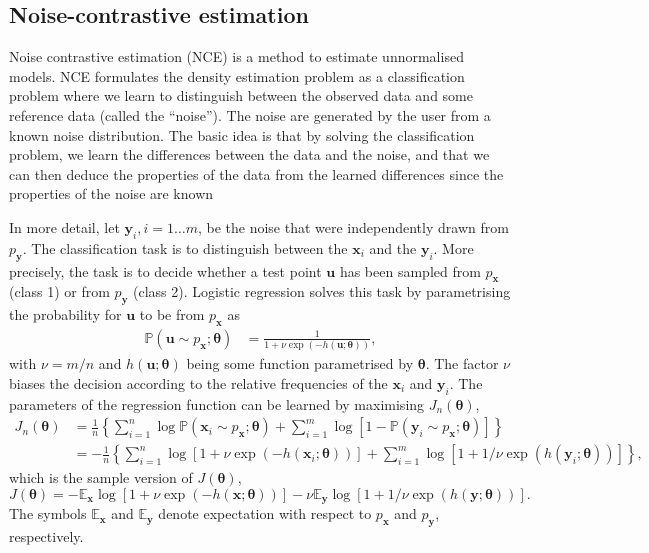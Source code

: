 \documentclass[11pt, oneside]{article}
\newcommand{\thetab}{{\boldsymbol{\theta}}}
\newcommand{\pdata}{p_{ \mathbf x}}
\newcommand{\pnoise}{p_{ \mathbf y}}
\renewcommand{\u}{{\mathbf u}}
\newcommand{\x}{{\mathbf x}}
\newcommand{\y}{{\mathbf y}}
\renewcommand{\P}{\mathbb{P}}
\newcommand{\E}{\mathbb{E}}
\newcommand{\Ex}{\E_{\x}}
\newcommand{\Ey}{\E_{\y}}
\begin{document}
\subsection{Noise-contrastive estimation}
Noise contrastive estimation (NCE) is a method to estimate
unnormalised models. NCE formulates the density estimation
problem as a classification problem where we learn to distinguish
between the observed data and some reference data (called the
``noise''). The noise are generated by the user from a known noise
distribution. The basic idea is that by solving the classification
problem, we learn the differences between the data and the noise, and
that we can then deduce the properties of the data from the learned
differences since the properties of the noise are known

In more detail, let $\y_i, i=1 \ldots m$, be the noise that were
independently drawn from $\pnoise$. The classification task is to
distinguish between the $\x_i$ and the $\y_i$. More precisely, the
task is to decide whether a test point $\u$ has been sampled from
$\pdata$ (class 1) or from $\pnoise$ (class 2). Logistic regression
solves this task by parametrising the probability for $\u$ to be from
$\pdata$ as
\begin{align}
  \P( \u \sim \pdata; \thetab ) &= \frac{1}{1+\nu \exp(-h(\u;\thetab))}, 
\end{align}
with $\nu = m/n$ and $h(\u;\thetab)$ being some function
para\-metrised by $\thetab$. The factor $\nu$ biases the decision
according to the relative frequencies of the $\x_i$ and $\y_i$. The
parameters of the regression function can be learned by maximising $J_n(\thetab)$,
\begin{align}
  J_n(\thetab)&= \frac{1}{n} \left\{\sum_{i=1}^{n} \log  \P( \x_i \sim \pdata; \thetab ) + \sum_{i=1}^{m} \log\left[1- \P( \y_i \sim \pdata; \thetab )\right]\right\}\\
  & = -\frac{1}{n} \left\{\sum_{i=1}^{n} \log \left[1+\nu \exp(-h(\x_i;\thetab))\right] + \sum_{i=1}^{m} \log \left[1+1/\nu \exp(h(\y_i;\thetab))\right]\right\},
  \label{eq:Jn}
\end{align}
which is the sample version of $J(\thetab)$,
\begin{equation}
  J(\thetab) = - \Ex  \log \left[1+\nu \exp(-h(\x;\thetab))\right] - \nu \Ey \log \left[1+1/\nu \exp(h(\y;\thetab))\right].
  \label{eq:J}
\end{equation}
The symbols $\Ex$ and $\Ey$ denote expectation with respect to $\pdata$ and $\pnoise$, respectively.
\end{document}
